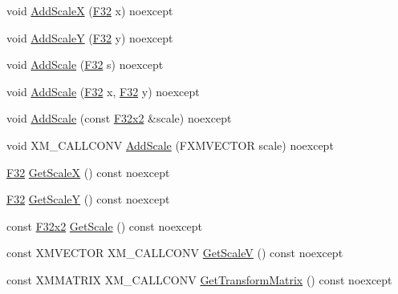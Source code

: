 \begin{DoxyCompactItemize}
\item 
void \mbox{\hyperlink{classmage_1_1_sprite_transform_a4f2a1c2dd0da35c0fdf0d43a675be3bc}{Add\+ScaleX}} (\mbox{\hyperlink{namespacemage_aa97e833b45f06d60a0a9c4fc22ae02c0}{F32}} x) noexcept
\item 
void \mbox{\hyperlink{classmage_1_1_sprite_transform_ad2254dc1ae1fc1d9332bd00fed8eb4af}{Add\+ScaleY}} (\mbox{\hyperlink{namespacemage_aa97e833b45f06d60a0a9c4fc22ae02c0}{F32}} y) noexcept
\item 
void \mbox{\hyperlink{classmage_1_1_sprite_transform_a44dd155f58f2ebdb7e44a366933863fa}{Add\+Scale}} (\mbox{\hyperlink{namespacemage_aa97e833b45f06d60a0a9c4fc22ae02c0}{F32}} s) noexcept
\item 
void \mbox{\hyperlink{classmage_1_1_sprite_transform_a72cebc3612bc3ea91989234fb8fb03d2}{Add\+Scale}} (\mbox{\hyperlink{namespacemage_aa97e833b45f06d60a0a9c4fc22ae02c0}{F32}} x, \mbox{\hyperlink{namespacemage_aa97e833b45f06d60a0a9c4fc22ae02c0}{F32}} y) noexcept
\item 
void \mbox{\hyperlink{classmage_1_1_sprite_transform_aa997f073a285a0f8fc67a25c436cc122}{Add\+Scale}} (const \mbox{\hyperlink{namespacemage_a9dc0d34d6ecc87e4cfa4a826102117bc}{F32x2}} \&scale) noexcept
\item 
void X\+M\+\_\+\+C\+A\+L\+L\+C\+O\+NV \mbox{\hyperlink{classmage_1_1_sprite_transform_a9064eb670f25dbcd6937971b9ccaadda}{Add\+Scale}} (F\+X\+M\+V\+E\+C\+T\+OR scale) noexcept
\item 
\mbox{\hyperlink{namespacemage_aa97e833b45f06d60a0a9c4fc22ae02c0}{F32}} \mbox{\hyperlink{classmage_1_1_sprite_transform_af82246da3228dfc1588ca806ddf6315f}{Get\+ScaleX}} () const noexcept
\item 
\mbox{\hyperlink{namespacemage_aa97e833b45f06d60a0a9c4fc22ae02c0}{F32}} \mbox{\hyperlink{classmage_1_1_sprite_transform_a07010f5d7e781ca641456b18fd16e67f}{Get\+ScaleY}} () const noexcept
\item 
const \mbox{\hyperlink{namespacemage_a9dc0d34d6ecc87e4cfa4a826102117bc}{F32x2}} \mbox{\hyperlink{classmage_1_1_sprite_transform_a5dd81c8943599dc25952d8c62fb81252}{Get\+Scale}} () const noexcept
\item 
const X\+M\+V\+E\+C\+T\+OR X\+M\+\_\+\+C\+A\+L\+L\+C\+O\+NV \mbox{\hyperlink{classmage_1_1_sprite_transform_ac201420d468fef1d1bb434cd7f1f0515}{Get\+ScaleV}} () const noexcept
\item 
const X\+M\+M\+A\+T\+R\+IX X\+M\+\_\+\+C\+A\+L\+L\+C\+O\+NV \mbox{\hyperlink{classmage_1_1_sprite_transform_ac9d30bb4a52ababcdee4514aac7f7402}{Get\+Transform\+Matrix}} () const noexcept
\end{DoxyCompactItemize}
